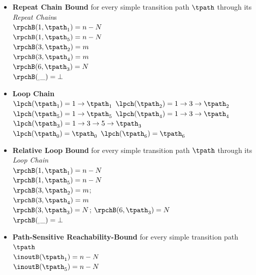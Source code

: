 \begin{enumerate}
\begin{itemize}
    $\rpchset(6, \tpath_3) = \{6: \rprepeat(\tpath_3)\}$
    \\
    $\rpchset(_, \_) = \emptyset$ 
    \item \textbf{Repeat Chain Bound} for every simple transition path $\tpath$ through its \emph{Repeat Chain}s
    \\
    $\rpchB(1, \tpath_1) = n - N$ \\
    $\rpchB(1, \tpath_5) = n - N$ \\
    $\rpchB(3, \tpath_2) = m$ \\
    $\rpchB(3, \tpath_4) = m$ \\
    $\rpchB(6, \tpath_3) = N$ \\
    $\rpchB(_, \_) = \bot $ 
    \item \textbf{Loop Chain}
    \\
    $\lpch(\tpath_1) = 1\to \tpath_1$ \quad
    $\lpch(\tpath_2) = 1 \to 3 \to \tpath_2$ \\
    $\lpch(\tpath_5) = 1\to \tpath_5$ \quad
    $\lpch(\tpath_4) = 1 \to 3 \to \tpath_4$ \\
    \highlight
    {$\lpch(\tpath_3) = 1 \to 3 \to 5 \to \tpath_3$ }\\
    $\lpch(\tpath_0) = \tpath_0$ \quad
    $\lpch(\tpath_6) = \tpath_6$ 
      \item \textbf{{Relative Loop Bound}} for every simple transition path $\tpath$ through its \emph{Loop Chain}
    \\
    $\rpchB(1, \tpath_1) = n - N$ \\
    $\rpchB(1, \tpath_5) = n - N$ \\
     \quad  $\rpchB(3, \tpath_2) = m$; \\
     \quad $\rpchB(3, \tpath_4) = m$ \\
     \quad $\rpchB(3, \tpath_3) = N$; \quad $\rpchB(6, \tpath_3) = N$ \\
    $\rpchB(_, \_) = \bot $ 
    \item \textbf{Path-Sensitive Reachability-Bound} for every simple transition path $\tpath$
    \\
    $\inoutB(\tpath_1) = n - N$ \\
    $\inoutB(\tpath_5) = n - N$ \\

\end{itemize}
\end{enumerate}
